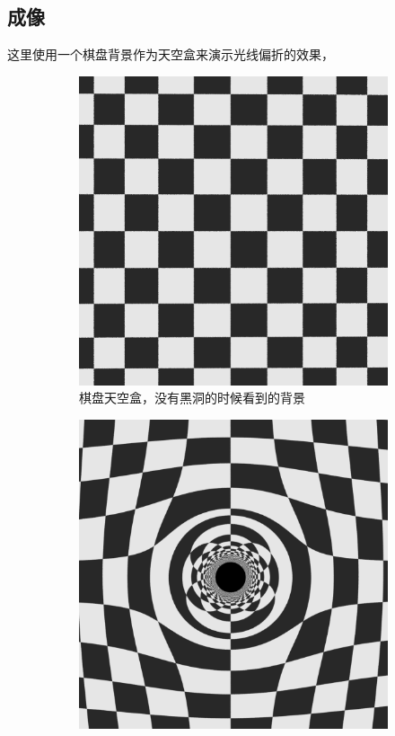 \subsection{成像}
这里使用一个棋盘背景作为天空盒来演示光线偏折的效果，
\begin{figure}[H]
    \centering
    \begin{subfigure}{.5\textwidth}
        \centering
        \includegraphics[scale=0.2]{images/chessboard.png}
        \caption{棋盘天空盒，没有黑洞的时候看到的背景}
        \label{fig:chessboard} %
    \end{subfigure}%
    \begin{subfigure}{.5\textwidth}
        \centering
        \includegraphics[scale=0.2]{images/blackhole_chessboard.png}

\end{subfigure}
\end{figure}
